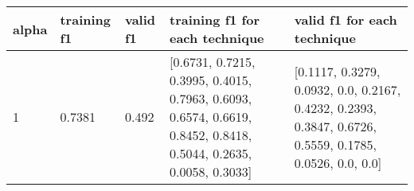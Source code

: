 \documentclass{article}%
\begin{document}
\begin{longtable}{l l l l l}%
\hline%
alpha&training f1&valid f1&training f1 for each technique&valid f1 for each technique\\%
\hline%
\endhead%
\hline%
1&0.7381&0.492&{[}0.6731, 0.7215, 0.3995, 0.4015, 0.7963, 0.6093, 0.6574, 0.6619, 0.8452, 0.8418, 0.5044, 0.2635, 0.0058, 0.3033{]}&{[}0.1117, 0.3279, 0.0932, 0.0, 0.2167, 0.4232, 0.2393, 0.3847, 0.6726, 0.5559, 0.1785, 0.0526, 0.0, 0.0{]}\\%
\hline%
\end{longtable}%
\end{document}
